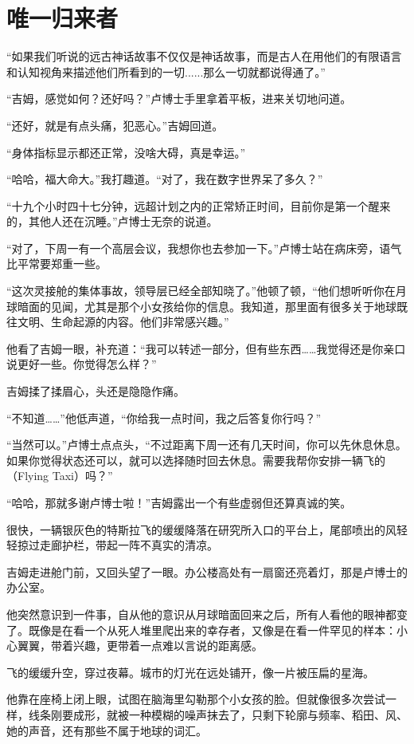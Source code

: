 \chapter{唯一归来者}

“如果我们听说的远古神话故事不仅仅是神话故事，而是古人在用他们的有限语言和认知视角来描述他们所看到的一切......那么一切就都说得通了。”

“吉姆，感觉如何？还好吗？”卢博士手里拿着平板，进来关切地问道。

“还好，就是有点头痛，犯恶心。”吉姆回道。

“身体指标显示都还正常，没啥大碍，真是幸运。”

“哈哈，福大命大。”我打趣道。“对了，我在数字世界呆了多久？”

“十九个小时四十七分钟，远超计划之内的正常矫正时间，目前你是第一个醒来的，其他人还在沉睡。”卢博士无奈的说道。

“对了，下周一有一个高层会议，我想你也去参加一下。”卢博士站在病床旁，语气比平常要郑重一些。

“这次灵接舱的集体事故，领导层已经全部知晓了。”他顿了顿，“他们想听听你在月球暗面的见闻，尤其是那个小女孩给你的信息。我知道，那里面有很多关于地球既往文明、生命起源的内容。他们非常感兴趣。”

他看了吉姆一眼，补充道：“我可以转述一部分，但有些东西……我觉得还是你亲口说更好一些。你觉得怎么样？”

吉姆揉了揉眉心，头还是隐隐作痛。

“不知道……”他低声道，“你给我一点时间，我之后答复你行吗？”

“当然可以。”卢博士点点头，“不过距离下周一还有几天时间，你可以先休息休息。如果你觉得状态还可以，就可以选择随时回去休息。需要我帮你安排一辆飞的（Flying Taxi）吗？”

“哈哈，那就多谢卢博士啦！”吉姆露出一个有些虚弱但还算真诚的笑。

很快，一辆银灰色的特斯拉飞的缓缓降落在研究所入口的平台上，尾部喷出的风轻轻掠过走廊护栏，带起一阵不真实的清凉。

吉姆走进舱门前，又回头望了一眼。办公楼高处有一扇窗还亮着灯，那是卢博士的办公室。

他突然意识到一件事，自从他的意识从月球暗面回来之后，所有人看他的眼神都变了。既像是在看一个从死人堆里爬出来的幸存者，又像是在看一件罕见的样本：小心翼翼，带着兴趣，更带着一点难以言说的距离感。

飞的缓缓升空，穿过夜幕。城市的灯光在远处铺开，像一片被压扁的星海。

他靠在座椅上闭上眼，试图在脑海里勾勒那个小女孩的脸。但就像很多次尝试一样，线条刚要成形，就被一种模糊的噪声抹去了，只剩下轮廓与频率、稻田、风、她的声音，还有那些不属于地球的词汇。

